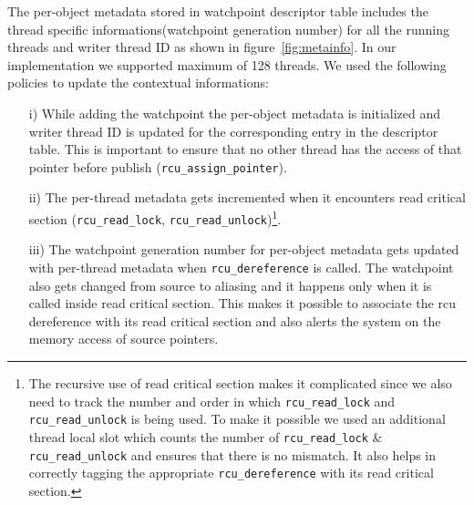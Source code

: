 The per-object metadata stored in watchpoint descriptor table includes the thread specific informations(watchpoint generation number) for all the running threads and writer thread ID as shown in figure~\ref{fig:metainfo}. In our implementation we supported maximum of 128 threads. We used the following policies to update the contextual informations:
\begin{enumerate}
    	\item[i)] While adding the watchpoint the per-object metadata is initialized and writer thread ID is updated for the corresponding  entry in the descriptor table.   This is important to ensure that no other thread has the access of that pointer before publish (\texttt{rcu\_assign\_pointer}).
	\item[ii)] The per-thread metadata gets incremented when it encounters read critical section (\texttt{rcu\_read\_lock}, \texttt{rcu\_read\_unlock})\footnote{The recursive use of read critical section makes it complicated since we also need to track the number and order in which \texttt{rcu\_read\_lock} and \texttt{rcu\_read\_unlock} is being used. To make it possible we used an additional thread local slot which counts the number of \texttt{rcu\_read\_lock} \& \texttt{rcu\_read\_unlock} and ensures that there is no mismatch. It also helps in correctly tagging the appropriate \texttt{rcu\_dereference} with its read critical section.}.  
	\item[iii)] The watchpoint generation number for per-object metadata gets updated with per-thread metadata when \texttt{rcu\_dereference} is called. The watchpoint also gets changed from source to aliasing and it happens only when it is called inside read critical section. This makes it possible to associate the rcu dereference with its read critical section and also alerts the system on the memory access of source pointers.
\end{enumerate}


